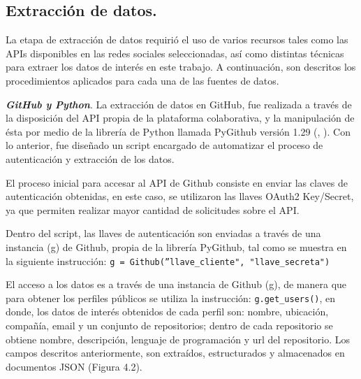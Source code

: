  
 

\subsection{Extracción de datos.}
\label{subsec:subsec04}

La etapa de extracción de datos requirió el uso de varios recursos tales como las APIs disponibles en las redes sociales seleccionadas, así como distintas técnicas para extraer los datos de interés en este trabajo. A continuación, son descritos los procedimientos aplicados para cada una de las fuentes de datos.

\textit{\textbf{GitHub y Python}}. 
La extracción de datos en GitHub, fue realizada a través de la disposición del API propia de la plataforma colaborativa, y la manipulación de ésta por medio de la librería de Python llamada PyGithub versión 1.29 (\citeauthor{pygithub}, \citeyear{pygithub}). Con lo anterior, fue diseñado un script encargado de automatizar el proceso de autenticación y extracción de los datos.

El proceso inicial para accesar al API de Github consiste en enviar las claves de autenticación obtenidas, en este caso, se utilizaron las llaves OAuth2 Key/Secret, ya que permiten realizar mayor cantidad de solicitudes sobre el API.

Dentro del script, las llaves de autenticación son enviadas a través de una instancia (g) de Github, propia de la librería PyGithub, tal como se muestra en la siguiente instrucción: \texttt{g = Github(''llave\_cliente", "llave\_secreta")}

El acceso a los datos es a través de una instancia de Github (g), de manera que para obtener los perfiles públicos se utiliza la instrucción: \texttt{g.get\_users()}, en donde, los datos de interés obtenidos de cada perfil son: nombre, ubicación, compañía, email y un conjunto de repositorios; dentro de cada repositorio se obtiene nombre, descripción, lenguaje de programación y url del repositorio. Los campos descritos anteriormente, son extraídos, estructurados y almacenados en documentos JSON (Figura 4.2).

